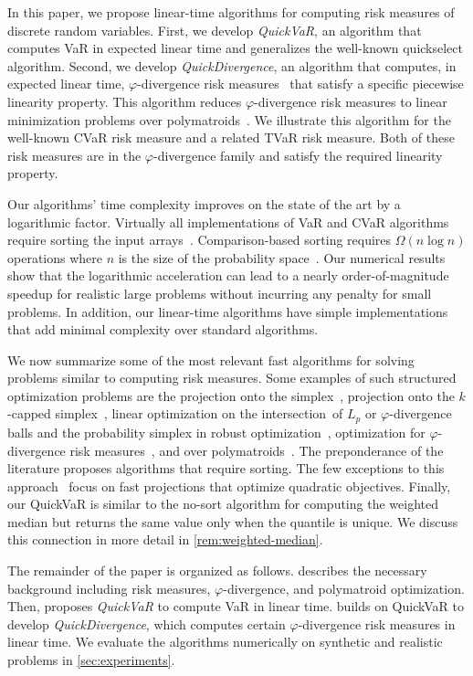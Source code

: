 In this paper, we propose linear-time algorithms for computing risk measures of discrete random variables. First, we develop \emph{QuickVaR}, an algorithm that computes VaR in expected linear time and generalizes the well-known quickselect algorithm. Second, we develop \emph{QuickDivergence}, an algorithm that computes, in expected linear time, $\varphi$-divergence risk measures~\cite{Ahmadi-Javid2012} that satisfy a specific piecewise linearity property. This algorithm reduces $\varphi$-divergence risk measures to linear minimization problems over polymatroids~\cite{Follmer2016}. We illustrate this algorithm for the well-known CVaR risk measure and a related TVaR risk measure. Both of these risk measures are in the $\varphi$-divergence family and satisfy the required linearity property.  

Our algorithms' time complexity improves on the state of the art by a logarithmic factor. Virtually all implementations of VaR and CVaR algorithms require sorting the input arrays~\cite{Follmer2016}. Comparison-based sorting requires $\Omega(n \log n)$ operations where $n$ is the size of the probability space~\cite{Korte2012}. Our numerical results show that the logarithmic acceleration can lead to a nearly order-of-magnitude speedup for realistic large problems without incurring any penalty for small problems. In addition, our linear-time algorithms have simple implementations that add minimal complexity over standard algorithms.

We now summarize some of the most relevant fast algorithms for solving problems similar to computing risk measures. Some examples of such structured optimization problems are the projection onto the simplex~\cite{adam2019projectionscanonicalsimplexadditional,Wang2013Simplex}, projection onto the $k$-capped simplex~\cite{kcapped_ang,Lim2016}, linear optimization on the intersection~of $L_p$ or $\varphi$-divergence balls and the probability simplex in robust optimization~\cite{Ho2022}, optimization for $\varphi$-divergence risk measures~\cite{Ahmadi-Javid2012}, and over polymatroids~\cite{Korte2012}. The preponderance of the literature proposes algorithms that require sorting. The few exceptions to this approach~\cite{Condat2016,Lim2016} focus on fast projections that optimize quadratic objectives. Finally, our QuickVaR is similar to the no-sort algorithm for computing the weighted median but returns the same value only when the quantile is unique. We discuss this connection in more detail in \cref{rem:weighted-median}. 

The remainder of the paper is organized as follows.  describes the necessary background including risk measures, $\varphi$-divergence, and polymatroid optimization. Then,  proposes \emph{QuickVaR} to compute VaR in linear time.  builds on QuickVaR to develop \emph{QuickDivergence}, which computes certain $\varphi$-divergence risk measures in linear time.  We evaluate the algorithms numerically on synthetic and realistic problems in \cref{sec:experiments}.



